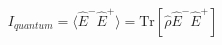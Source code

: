 \documentclass[preview]{standalone}
\begin{document}
\begin{align*}
I_{quantum} = \langle\hat{E}^-\hat{E}^+\rangle = \text{Tr}[\hat{\rho}\hat{E}^-\hat{E}^+]
\end{align*}
\end{document}
